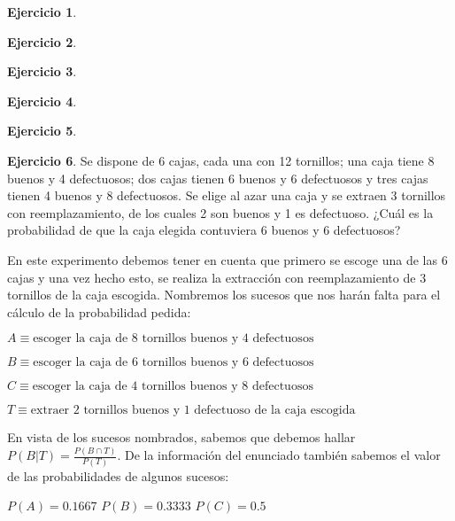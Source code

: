 \documentclass[a4paper, 12pt]{article}
\theoremstyle{definition}
\newtheorem{ej}{Ejercicio}
\begin{document}
\begin{ej}
\end{ej}

\begin{ej}
\end{ej}

\begin{ej}
\end{ej}

\begin{ej}
\end{ej}

\begin{ej}
\end{ej}

\newpage

\begin{ej}
Se dispone de 6 cajas, cada una con 12 tornillos; una caja tiene 8 buenos y 4 defectuosos; dos
cajas tienen 6 buenos y 6 defectuosos y tres cajas tienen 4 buenos y 8 defectuosos. Se elige al
azar una caja y se extraen 3 tornillos con reemplazamiento, de los cuales 2 son buenos y 1 es
defectuoso. ¿Cuál es la probabilidad de que la caja elegida contuviera 6 buenos y 6 defectuosos?

\medskip

En este experimento debemos tener en cuenta que primero se escoge una de las 6 cajas y una vez hecho esto, se realiza la extracción con reemplazamiento de 3 tornillos de la caja escogida. Nombremos los sucesos que nos harán falta para el cálculo de la probabilidad pedida:

\begin{center}
    $A \equiv \text{escoger la caja de 8 tornillos buenos y 4 defectuosos}$
    
    $B \equiv \text{escoger la caja de 6 tornillos buenos y 6 defectuosos}$
    
    $C \equiv \text{escoger la caja de 4 tornillos buenos y 8 defectuosos}$
    
    $T \equiv \text{extraer 2 tornillos buenos y 1 defectuoso de la caja escogida}$
\end{center}

En vista de los sucesos nombrados, sabemos que debemos hallar $P(B|T) = \frac{P(B \cap T)}{P(T)}$. De la información del enunciado también sabemos el valor de las probabilidades de algunos sucesos:

\begin{center}
    $P(A) = 0.1667$ \hspace{1cm} $P(B) = 0.3333$ \hspace{1cm} $P(C) = 0.5$
\end{center}


\end{ej}
\end{document}
